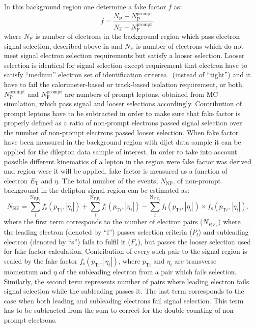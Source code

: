 In this background region one determine a fake factor $f$ as:
\begin{equation}
f = \frac{N_{\mathrm{P}} - N_{\mathrm{P}}^{\mathrm{prompt}}}{N_{\mathrm{F}}  - N_{\mathrm{F}}^{\mathrm{prompt}}}.
\label{eq:fakefactor}
\end{equation}
where $N_{\mathrm{P}}$ is number of electrons in the background region which pass electron signal selection,
described above in  and $N_{\mathrm{F}}$ is number of electrons which do not meet 
signal electron selection requirements but satisfy a looser selection. Looser selection is identical for signal selection except 
requirement that electron have to satisfy ``medium'' electron set of identification criterea~\cite{electron_tight} (instead of ``tight'') 
and it have to fail the calorimeter-based or track-based isolation requirement, or both.
$N_{\mathrm{P}}^{\mathrm{prompt}}$ and $N_{\mathrm{F}}^{\mathrm{prompt}}$ are numbers of prompt
leptons, obtained from MC simulation, which pass signal and looser selections accordingly.
Contribution of prompt leptons have to be subtracted in order to make sure that 
fake factor is properly defined as a ratio of non-prompt electrons passed signal selection over 
the number of non-prompt electrons passed looser selection.
When fake factor have been measured in the background region with dijet data sample it can be applied for the dilepton data sample of interest.
In order to take into account possible different kinematics of a lepton in the region were fake factor was derived 
and region were it will be applied, fake factor is measured as a function of electron $E_\mathrm{T}$ and $\eta$.
The total number of the events, $N_{\mathrm{NP}}$, of non-prompt background in the delipton signal region can be estimated as:
\begin{equation}
N_{\mathrm{NP}} = \sum_{i}^{\mathrm{N_{P_l F_s}}} f_{\mathrm{s}}(p_{\mathrm{Ti}},|\eta_{i}|) + \sum_{i}^{\mathrm{N_{F_l P_s}}} f_{\mathrm{l}}(p_{\mathrm{T}i},|\eta_{i}|) - \sum_{i}^{\mathrm{N_{F_l F_s}}} f_{\mathrm{l}}(p_{\mathrm{T}i},|\eta_{i}|) \times f_{\mathrm{s}}(p_{\mathrm{T}i},|\eta_{i}|).
\label{eq:fake_pred}
\end{equation}
where the first term corresponds to the number of electron pairs ($N_{P_l F_s}$) 
where the leading electron (denoted by ``l'') passes selection criteria ($P_l$) and subleading electron 
(denoted by ``s'')
fails to fulfil it ($F_s$), but passes the looser selection used for fake factor calculation. 
Contribution of every such pair to the signal region is scaled by the fake factor 
$f_{\mathrm{s}}(p_{\mathrm{Ti}},|\eta_{i}|)$, where $p_\mathrm{Ti}$ and $\eta_{i}$ are transverse momentum and $\eta$
of the subleading electron from a pair which fails selection. 
Similarly, the second term represents number of pairs where
leading electron fails signal selection while the subleading passes it. 
The last term corresponds to the case when both leading
and subleading electrons fail signal selection. This term has to be subtracted from the sum to correct for the double
counting of non-prompt electrons.

